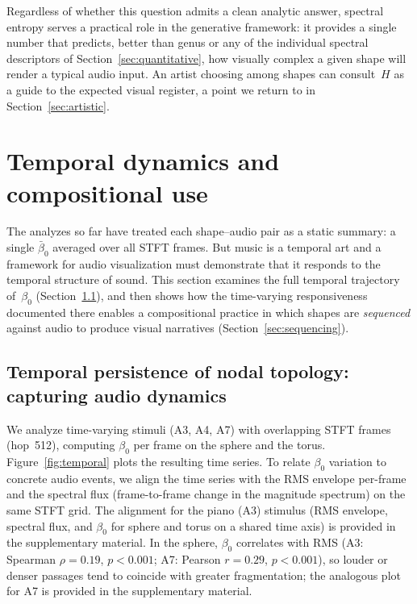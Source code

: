 \documentclass[]{interact}
\theoremstyle{plain}
\theoremstyle{definition}
\theoremstyle{remark}
\begin{document}
Regardless of whether this question admits a clean analytic answer, spectral entropy serves a practical role in the generative framework: it provides a single number that predicts, better than genus or any of the individual spectral descriptors of Section~\ref{sec:quantitative}, how visually complex a given shape will render a typical audio input. An artist choosing among shapes can consult~$H$ as a guide to the expected visual register, a point we return to in Section~\ref{sec:artistic}.


\section{Temporal dynamics and compositional use}
\label{sec:temporal_compositional}

The analyzes so far have treated each shape--audio pair as a static summary: a single $\bar{\beta}_0$ averaged over all STFT frames. But music is a temporal art and a framework for audio visualization must demonstrate that it responds to the temporal structure of sound. This section examines the full temporal trajectory of~$\beta_0$ (Section~\ref{sec:temporal}), and then shows how the time-varying responsiveness documented there enables a compositional practice in which shapes are \emph{sequenced} against audio to produce visual narratives (Section~\ref{sec:sequencing}).

\subsection{Temporal persistence of nodal topology: capturing audio dynamics}
\label{sec:temporal}

We analyze time-varying stimuli (A3, A4, A7) with overlapping STFT frames (hop~512), computing $\beta_0$ per frame on the sphere and the torus. Figure~\ref{fig:temporal} plots the resulting time series. To relate $\beta_0$ variation to concrete audio events, we align the time series with the RMS envelope per-frame and the spectral flux (frame-to-frame change in the magnitude spectrum) on the same STFT grid. The alignment for the piano (A3) stimulus (RMS envelope, spectral flux, and $\beta_0$ for sphere and torus on a shared time axis) is provided in the supplementary material. In the sphere, $\beta_0$ correlates with RMS (A3: Spearman $\rho=0.19$, $p<0.001$; A7: Pearson $r=0.29$, $p<0.001$), so louder or denser passages tend to coincide with greater fragmentation; the analogous plot for A7 is provided in the supplementary material.
\end{document}
